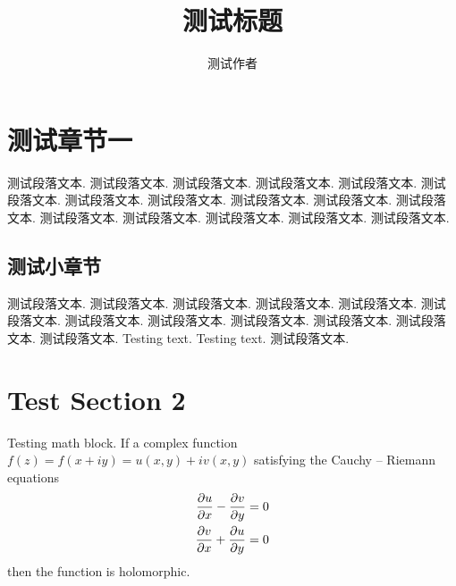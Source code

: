 \documentclass[a4paper,12pt,english]{article}
\begin{document}
\title{测试标题}
\author{测试作者}
\maketitle


\section{测试章节一}

测试段落文本. 测试段落文本. 测试段落文本. 测试段落文本. 测试段落文本. 测试段落文本. 测试段落文本. 测试段落文本. 测试段落文本. 测试段落文本. 测试段落文本. 测试段落文本. 测试段落文本. 测试段落文本. 测试段落文本. 测试段落文本.

\subsection{测试小章节}

测试段落文本. 测试段落文本. 测试段落文本. 测试段落文本. 测试段落文本. 测试段落文本. 测试段落文本. 测试段落文本. 测试段落文本. 测试段落文本. 测试段落文本. 测试段落文本. Testing text. Testing text. 测试段落文本.

\section{Test Section 2}

Testing math block. If a complex function $f(z)=f(x+iy)=u(x,y)+iv(x,y)$ satisfying the Cauchy -- Riemann equations
\begin{align*}
\pdv{u}{x} - \pdv{v}{y} = 0 \\
\pdv{v}{x} + \pdv{u}{y} = 0
\end{align*}
then the function is holomorphic.
\end{document}
